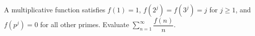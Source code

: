 A multiplicative function satisfies $f(1)=1$, $f(2^j)=f(3^j)=j$ for $j\ge1$, and $f(p^j)=0$ for all other primes. Evaluate $\displaystyle\sum_{n=1}^\infty\dfrac{f(n)}{n}$.

